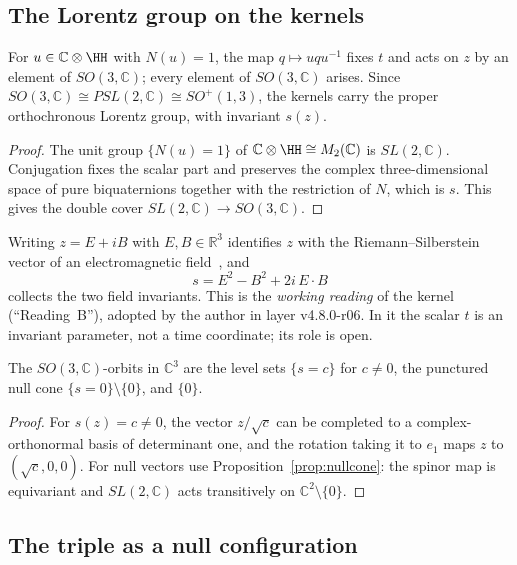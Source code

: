 \subsection{The Lorentz group on the kernels}

\begin{proposition}[Reading B]\label{prop:readingB}
For \(u\in\mathbb C\otimes\HH\) with \(N(u)=1\), the map \(q\mapsto uqu^{-1}\) fixes \(t\) and acts on \(z\) by an element of
\(SO(3,\mathbb C)\); every element of \(SO(3,\mathbb C)\) arises.  Since \(SO(3,\mathbb C)\cong PSL(2,\mathbb C)\cong
SO^+(1,3)\), the kernels carry the proper orthochronous Lorentz group, with invariant \(s(z)\).
\end{proposition}

\begin{proof}
The unit group \(\{N(u)=1\}\) of \(\mathbb C\otimes\HH\cong M_2(\mathbb C)\) is \(SL(2,\mathbb C)\).  Conjugation fixes the scalar
part and preserves the complex three-dimensional space of pure biquaternions together with the restriction of \(N\), which is
\(s\).  This gives the double cover \(SL(2,\mathbb C)\to SO(3,\mathbb C)\).
\end{proof}

Writing \(z=E+iB\) with \(E,B\in\mathbb R^3\) identifies \(z\) with the Riemann--Silberstein vector of an electromagnetic
field~\cite{bialynicki}, and
\[
s=E^2-B^2+2i\,E\!\cdot\!B
\]
collects the two field invariants.  This is the \emph{working reading} of the kernel (``Reading~B''), adopted by the author
in layer v4.8.0-r06.  In it the scalar \(t\) is an invariant parameter, not a time coordinate; its role is open.

\begin{proposition}[Orbits]\label{prop:orbits}
The \(SO(3,\mathbb C)\)-orbits in \(\mathbb C^3\) are the level sets \(\{s=c\}\) for \(c\neq0\), the punctured null cone
\(\{s=0\}\setminus\{0\}\), and \(\{0\}\).
\end{proposition}

\begin{proof}
For \(s(z)=c\neq0\), the vector \(z/\sqrt c\) can be completed to a complex-orthonormal basis of determinant one, and the
rotation taking it to \(e_1\) maps \(z\) to \((\sqrt c,0,0)\).  For null vectors use Proposition~\ref{prop:nullcone}: the
spinor map is equivariant and \(SL(2,\mathbb C)\) acts transitively on \(\mathbb C^2\setminus\{0\}\).
\end{proof}

\subsection{The triple as a null configuration}

